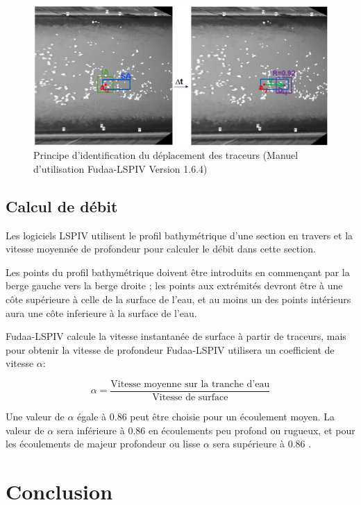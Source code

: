 \documentclass[
]{article}
\begin{document}
\begin{figure}[H]
\includegraphics[width=1\linewidth,]{images/calculationdevitesse} \caption{Principe d'identification du déplacement des traceurs (Manuel d'utilisation Fudaa-LSPIV Version 1.6.4)}\label{fig:unnamed-chunk-4}
\end{figure}

\hypertarget{calcul-de-duxe9bit}{%
\subsection{Calcul de débit}\label{calcul-de-duxe9bit}}

Les logiciels LSPIV utilisent le profil bathymétrique d'une section en travers et la vitesse moyennée de profondeur pour calculer le débit dans cette section.

Les points du profil bathymétrique doivent être introduits en commençant par la berge gauche vers la berge droite ; les points aux extrémités devront être à une côte supérieure à celle de la surface de l'eau, et au moins un des points intérieurs aura une côte inferieure à la surface de l'eau.

Fudaa-LSPIV calcule la vitesse instantanée de surface à partir de traceurs, mais pour obtenir la vitesse de profondeur Fudaa-LSPIV utilisera un coefficient de vitesse \(\alpha\):

\begin{equation}
\alpha =  \frac{\text{Vitesse moyenne sur la tranche d'eau}}{\text{Vitesse de surface}}
\end{equation}

Une valeur de \(\alpha\) égale à 0.86 peut être choisie pour un écoulement moyen. La valeur de \(\alpha\) sera inférieure à 0.86 en écoulements peu profond ou rugueux, et pour les écoulements de majeur profondeur ou lisse \(\alpha\) sera supérieure à 0.86 \citep{hauet_application_2013} .

\hypertarget{conclusion}{%
\section{Conclusion}\label{conclusion}}
\end{document}
